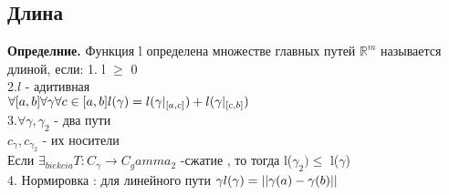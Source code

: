 \documentclass[12pt, a4paper]{article}
\begin{document}
\subsection{Длина}
\textbf{Определние.} Функция l определена множестве главных путей $\mathbb{R}^m$ называется длиной, если: 
 1. l  $\geq$ 0 \\
 
 2.$l$ - адитивная\\
          $\forall [a,b] \forall \gamma \forall c \in [a,b]\\
           l(\gamma) = l(\gamma|_{[a,c]})+l(\gamma|_{[c,b]})$\\
           
 3.$\forall \gamma,\gamma_2$ - два пути\\
        $c_\gamma, c_{\gamma_2}$ - их носители\\
        Если $\exists _{biekcia} T:  C_\gamma \rightarrow C_gamma_2$ -сжатие , то тогда l($\gamma_2)\leq$ l($\gamma$)\\
        
 4.  Нормировка : для линейного пути $\gamma   \\ l(\gamma)=||\gamma(a)-\gamma(b)||$  \\
\end{document}
